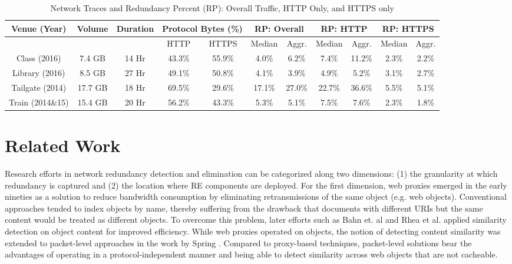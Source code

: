 \documentclass{sig-alternate}
\begin{document}
\begin{table*}[t!]
\centering
\begin{tabular}{|c|c|c|c|c||c|c|c|c|c|c|}
\hline
 Venue (Year)         & Volume     & Duration  & \multicolumn{2}{c||}{Protocol Bytes (\%)} & \multicolumn{2}{c|}{RP: Overall} & \multicolumn{2}{c|}{RP: HTTP} & \multicolumn{2}{c|}{RP: HTTPS}                     \\\hline         
                      &            &           & HTTP     & HTTPS                         & Median     & Aggr.           & Median   & Aggr.         & Median  & Aggr.   \\\hline
 Class (2016)         & 7.4 GB     & 14 Hr     & 43.3\%   & 55.9\%                        & 4.0\%      & 6.2\%           & 7.4\%    & 11.2\%        & 2.3\%   & 2.2\%   \\\hline
 Library (2016)       & 8.5 GB     & 27 Hr     & 49.1\%   & 50.8\%                        & 4.1\%      & 3.9\%           & 4.9\%    & 5.2\%         & 3.1\%   & 2.7\%   \\\hline  
 Tailgate (2014)      & 17.7 GB    & 18 Hr     & 69.5\%   & 29.6\%                        & 17.1\%	  & 27.0\%          & 22.7\%   & 36.6\%        & 5.5\%   & 5.1\%   \\\hline
 Train (2014\&15)     & 15.4 GB    & 20 Hr     & 56.2\%   & 43.3\%                        & 5.3\%      & 5.1\%           & 7.5\%    & 7.6\%         & 2.3\%   & 1.8\%   \\\hline
\end{tabular} 
\caption{Network Traces and Redundancy Percent (RP): Overall Traffic, HTTP Only, and HTTPS only} 
\label{Table:RE}
\end{table*}

\section{Related Work}

Research efforts in network redundancy detection and elimination can be categorized along two dimensions: (1) the granularity at which redundancy is captured and (2) the location where RE components are deployed. For the first dimension, web proxies emerged in the early nineties as a solution to reduce bandwidth consumption by eliminating retransmissions of the same object (e.g. web objects). Conventional approaches tended to index objects by name, thereby suffering from the drawback that documents with different URIs but the same content would be treated as different objects. To overcome this problem, later efforts such as Bahn et. al \cite{Bahn:2002} and Rhea et al. \cite{Rhea:2003} applied similarity detection on object content for improved efficiency. While web proxies operated on objects, the notion of detecting content similarity was extended to packet-level approaches in the work by Spring \cite{Spring:2000}. Compared to proxy-based techniques, packet-level solutions bear the advantages of operating in a protocol-independent manner and being able to detect similarity across web objects that are not cacheable. 
\end{document}
